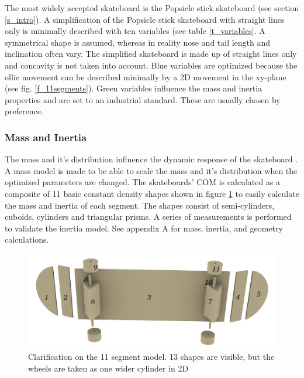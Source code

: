 \documentclass[default,iicol]{sn-jnl}
\theoremstyle{thmstyleone}%
\theoremstyle{thmstyletwo}%
\theoremstyle{thmstylethree}%
\begin{document}
The most widely accepted skateboard is the Popsicle stick skateboard (see section \ref{s_intro}). A simplification of the Popsicle stick skateboard with straight lines only is minimally described with ten variables (see table \ref{t_variables}. A symmetrical shape is assumed, whereas in reality nose and tail length and inclination often vary. The simplified skateboard is made up of straight lines only and concavity is not taken into account. Blue variables are optimized because the ollie movement can be described minimally by a 2D movement in the xy-plane (see fig. \ref{f_11segments}). Green variables influence the mass and inertia properties and are set to an industrial standard. These are usually chosen by preference.


\subsubsection{Mass and Inertia}\label{ss_mass}
The mass and it's distribution influence the dynamic response of the skateboard \cite{moore_force_nodate}. A mass model is made to be able to scale the mass and it's distribution when the optimized parameters are changed. The skateboards' COM is calculated as a composite of 11 basic constant density shapes shown in figure \ref{f_basicshapes} to easily calculate the mass and inertia of each segment. The shapes consist of semi-cylinders, cuboids, cylinders and triangular prisms. A series of measurements is performed to validate the inertia model. See appendix A for mass, inertia, and geometry calculations. 

\begin{figure}
    \centering
    \includegraphics[width = 0.5 \textwidth]{figure/Basicshapes.png}
    \caption[Exploded 11 segment model]{Clarification on the 11 segment model. 13 shapes are visible, but the wheels are taken as one wider cylinder in 2D}
    \label{f_basicshapes}
\end{figure}
\end{document}
